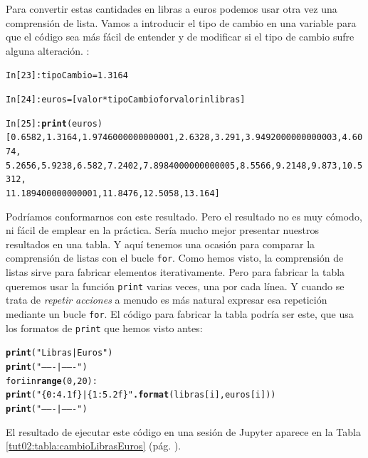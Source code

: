 \documentclass[10pt,a4paper]{article}\usepackage[]{graphicx}\usepackage[]{color}
\makeatletter
\newcommand{\hlstr}[1]{\textcolor[rgb]{0.192,0.494,0.8}{#1}}%
\newcommand{\hlkwd}[1]{\textcolor[rgb]{0.737,0.353,0.396}{\textbf{#1}}}%
\newenvironment{kframe}{%
 \def\at@end@of@kframe{}%
 \ifinner\ifhmode%
  \def\at@end@of@kframe{\end{minipage}}%
  \begin{minipage}{\columnwidth}%
 \fi\fi%
 \def\FrameCommand##1{\hskip\@totalleftmargin \hskip-\fboxsep
 \colorbox{shadecolor}{##1}\hskip-\fboxsep
     \hskip-\linewidth \hskip-\@totalleftmargin \hskip\columnwidth}%
 \MakeFramed {\advance\hsize-\width
   \@totalleftmargin\z@ \linewidth\hsize
   \@setminipage}}%
 {\par\unskip\endMakeFramed%
 \at@end@of@kframe}
\newenvironment{knitrout}{}{} %
\makeatother
\begin{document}
Para convertir estas cantidades en libras a euros podemos usar otra vez una comprensión de lista. Vamos a introducir el tipo de cambio en una variable para que el código sea más fácil de entender y de modificar si el tipo de cambio sufre alguna alteración. :
\begin{knitrout}
\color{fgcolor}\begin{kframe}
\begin{alltt}
In [23]: tipoCambio = 1.3164

In [24]: euros = [valor * tipoCambio for valor in libras]

In [25]: \hlkwd{print}(euros)
[0.6582, 1.3164, 1.9746000000000001, 2.6328, 3.291, 3.9492000000000003, 4.6074,
5.2656, 5.9238, 6.582, 7.2402, 7.8984000000000005, 8.5566, 9.2148, 9.873, 10.5312,
11.189400000000001, 11.8476, 12.5058, 13.164]
\end{alltt}
\end{kframe}
\end{knitrout}
Podríamos conformarnos con este resultado. Pero el resultado no es muy cómodo, ni fácil de emplear en la práctica. Sería mucho mejor presentar nuestros resultados en una tabla. Y aquí tenemos una ocasión para comparar la comprensión de listas con el bucle {\tt for}. Como hemos visto, la comprensión de listas sirve para fabricar elementos iterativamente. Pero para fabricar la tabla queremos usar la función {\tt print} varias veces, una por cada línea. Y cuando se trata de {\em repetir acciones} a menudo es más natural expresar esa repetición  mediante un bucle {\tt for}. El código para fabricar la tabla podría ser este, que usa los formatos de {\tt print} que hemos visto antes:
\begin{knitrout}
\color{fgcolor}\begin{kframe}
\begin{alltt}
\hlkwd{print}(\hlstr{"Libras |  Euros"})
\hlkwd{print}(\hlstr{"-------|-------"})
for i in \hlkwd{range}(0, 20):
  \hlkwd{print}(\hlstr{" \{0:4.1f\}  |  \{1:5.2f\}"}\hlkwd{.format}(libras[i], euros[i]))
  \hlkwd{print}(\hlstr{"-------|-------"})
\end{alltt}
\end{kframe}
\end{knitrout}
El resultado de ejecutar este código en una sesión de Jupyter aparece en la
Tabla \ref{tut02:tabla:cambioLibrasEuros} (pág. \pageref{tut02:tabla:cambioLibrasEuros}).
\end{document}

